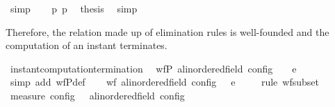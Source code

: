 \begin{isabellebody}
\ simp\isanewline
\ \ \isamarkupfalse%
\ p{}\ p{}\ \isamarkupfalse%
\ {\isacharquery}thesis\ \isamarkupfalse%
\ simp\isanewline
{}\isamarkupfalse%
%
\endisatagproof
{\isafoldproof}%
%
\isadelimproof
%
\endisadelimproof
%
\begin{isamarkuptext}%
Therefore, the relation made up of elimination rules is well-founded and the
  computation of an instant terminates.%
\end{isamarkuptext}\isamarkuptrue%
\isamarkupfalse%
\ instant{\isacharunderscore}computation{\isacharunderscore}termination{\isacharcolon}\isanewline
\ \ {\isacartoucheopen}wfP\ {\isacharparenleft}{\isasymlambda}{\isacharparenleft}{\isasymS}a{\isacharcolon}{\isacharcolon}linordered{\isacharunderscore}field\ config{\isacharparenright}\ {\isasymS}\ {\isacharparenleft}{\isasymS}\ \ {\isasymhookrightarrow}\isactrlsub e\isactrlsup {\isasymleftarrow}\ \ {\isasymS}\isanewline
%
\isadelimproof
%
\endisadelimproof
%
\isatagproof
{}\isamarkupfalse%
\ {\isacharparenleft}simp\ add{\isacharcolon}\ wfP{\isacharunderscore}def{\isacharparenright}\isanewline
\ \ \isamarkupfalse%
\ {\isacartoucheopen}wf\ {\isacharbraceleft}{\isacharparenleft}{\isacharparenleft}{\isasymS}a{\isacharcolon}{\isacharcolon}linordered{\isacharunderscore}field\ config{\isacharparenright}{\isacharcomma}\ {\isasymS}\ {\isasymS}\ {\isasymhookrightarrow}\isactrlsub e\isactrlsup {\isasymleftarrow}\ {\isasymS}\isanewline
\ \ \isamarkupfalse%
\ {\isacharparenleft}rule\ wf{\isacharunderscore}subset{\isacharparenright}\isanewline
\ \ \ \ \isamarkupfalse%
\ {\isacartoucheopen}measure\ {\isasymmu}\isactrlsub c\isactrlsub o\isactrlsub n\isactrlsub f\isactrlsub i\isactrlsub g\ {\isacharequal}\ {\isacharbraceleft}{\isacharparenleft}{\isasymS}\ {\isacharparenleft}{\isasymS}a{\isacharcolon}{\isacharcolon}linordered{\isacharunderscore}field\ config{\isacharparenright}{\isacharparenright}{\isachardot}\isanewline

\end{isabellebody}
